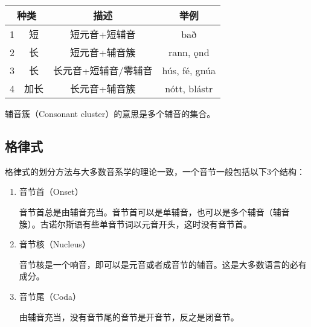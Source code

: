 \begin{table}[H]
\centering
\begin{tabular}{@{}cccc@{}}
\toprule
\multicolumn{2}{c}{种类} & 描述          & 举例             \\ \midrule
1         & 短          & 短元音+短辅音     & bað            \\
2         & 长          & 短元音+辅音簇     & rann, ǫnd      \\
3         & 长          & 长元音+短辅音/零辅音 & hús, fé, gnúa  \\
4         & 加长         & 长元音+辅音簇     & nótt,   blástr \\ \bottomrule
\end{tabular}
\end{table}
辅音簇（Consonant cluster）的意思是多个辅音的集合。

\subsection*{格律式}

格律式的划分方法与大多数音系学的理论一致，一个音节一般包括以下3个结构：
\begin{enumerate}[itemindent=1em]
    \item 音节首（Onset）
    
    音节首总是由辅音充当。音节首可以是单辅音，也可以是多个辅音（辅音簇）。古诺尔斯语有些单音节词以元音开头，这时没有音节首。
    \item 音节核（Nucleus）
    
    音节核是一个响音，即可以是元音或者成音节的辅音。这是大多数语言的必有成分。
    \item 音节尾（Coda）
    
    由辅音充当，没有音节尾的音节是开音节，反之是闭音节。

\end{enumerate}

